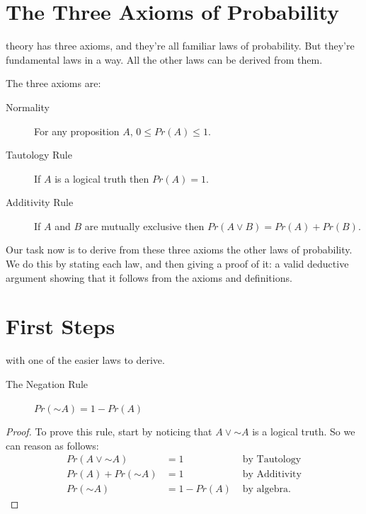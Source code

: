 \documentclass[justified]{tufte-book}
\renewcommand{\neg}{\mathbin{\sim}}
\newcommand{\p}{Pr}
\theoremstyle{definition}
\theoremstyle{definition}
\theoremstyle{definition}
\theoremstyle{remark}
\let\BeginKnitrBlock\begin \let\EndKnitrBlock\end
\begin{document}
\hypertarget{the-three-axioms-of-probability}{%
\section*{The Three Axioms of Probability}\label{the-three-axioms-of-probability}}

 theory has three axioms, and they're all familiar laws of probability. But they're fundamental laws in a way. All the other laws can be derived from them.

The three axioms are:

\begin{description}
\item[Normality]
For any proposition \(A\), \(0 \leq \p(A) \leq 1\).
\item[Tautology Rule]
If \(A\) is a logical truth then \(\p(A) = 1\).
\item[Additivity Rule]
If \(A\) and \(B\) are mutually exclusive then \(\p(A \vee B) = \p(A) + \p(B)\).
\end{description}

Our task now is to derive from these three axioms the other laws of probability. We do this by stating each law, and then giving a proof of it: a valid deductive argument showing that it follows from the axioms and definitions.

\hypertarget{first-steps}{%
\section*{First Steps}\label{first-steps}}

 with one of the easier laws to derive.

\begin{description}
\item[The Negation Rule]
\(\p(\neg A) = 1 - \p(A)\)
\end{description}

\BeginKnitrBlock{proof}
{}
To prove this rule, start by noticing that \(A \vee \neg A\) is a logical truth. So we can reason as follows:
\[
  \begin{aligned}
  \p(A \vee \neg A)  &= 1                 & \mbox{ by Tautology}\\
  \p(A) + \p(\neg A) &= 1                 & \mbox{ by Additivity}\\
  \p(\neg A)         &= 1 - \p(A)         & \mbox{ by algebra.}
  \end{aligned}
\]
\EndKnitrBlock{proof}
\end{document}
